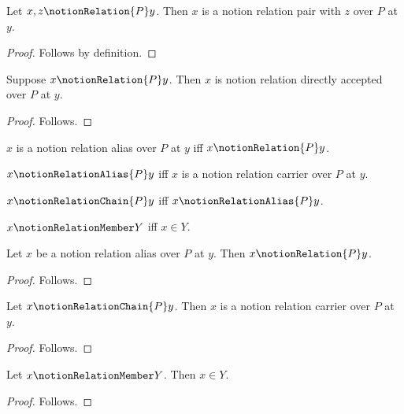 \begin{classification}\label{notion_relation_grouped}
    Let $x,z\notionRelation{P}y$.
    Then $x$ is a notion relation pair with $z$ over $P$ at $y$.
\end{classification}
\begin{proof}
    Follows by definition.
\end{proof}

\begin{proposition}\label{notion_relation_guard_use}
    Suppose $x\notionRelation{P}y$.
    Then $x$ is notion relation directly accepted over $P$ at $y$.
\end{proposition}
\begin{proof}
    Follows.
\end{proof}

\begin{abbreviation}\label{notion_relation_noun_alias}
    $x$ is a notion relation alias over $P$ at $y$ iff
    $x\notionRelation{P}y$.
\end{abbreviation}

\begin{abbreviation}\label{notion_relation_symbolic_alias}
    $x\notionRelationAlias{P}y$ iff
    $x$ is a notion relation carrier over $P$ at $y$.
\end{abbreviation}

\begin{abbreviation}\label{notion_relation_symbolic_chain}
    $x\notionRelationChain{P}y$ iff
    $x\notionRelationAlias{P}y$.
\end{abbreviation}

\begin{abbreviation}\label{notion_relation_member_alias}
    $x\notionRelationMember Y$ iff $x\in Y$.
\end{abbreviation}

\begin{proposition}\label{notion_relation_noun_alias_use}
    Let $x$ be a notion relation alias over $P$ at $y$.
    Then $x\notionRelation{P}y$.
\end{proposition}
\begin{proof}
    Follows.
\end{proof}

\begin{proposition}\label{notion_relation_symbolic_alias_use}
    Let $x\notionRelationChain{P}y$.
    Then $x$ is a notion relation carrier over $P$ at $y$.
\end{proposition}
\begin{proof}
    Follows.
\end{proof}

\begin{proposition}\label{notion_relation_member_alias_use}
    Let $x\notionRelationMember Y$.
    Then $x\in Y$.
\end{proposition}
\begin{proof}
    Follows.
\end{proof}
